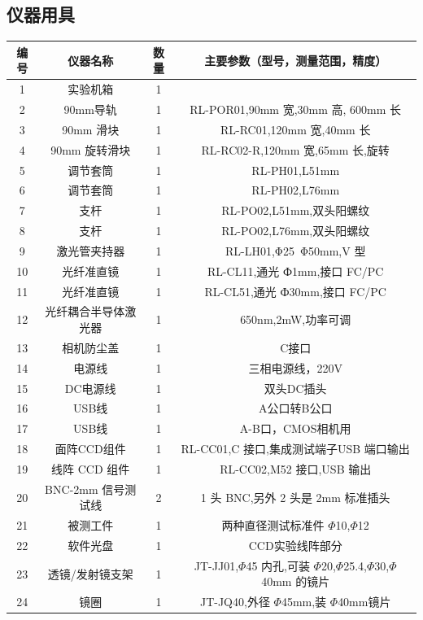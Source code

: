 \documentclass{ctexart}
\begin{document}
\subsection{仪器用具}
\begin{tabular}{c|c|c|c}
	\hline
        编号 & 仪器名称 &数量& 主要参数（型号，测量范围，精度） \\
	\hline 
	1 &  实验机箱&1 &\\
        2 &  90mm导轨&1 & RL-POR01,90mm 宽,30mm 高,
600mm 长\\
        3 & 90mm 滑块 &1&RL-RC01,120mm 宽,40mm 长\\
        4 & 90mm 旋转滑块  &1&RL-RC02-R,120mm 宽,65mm 长,旋转\\
        5 &  调节套筒 &1&RL-PH01,L51mm\\
        6 & 调节套筒 &1&RL-PH02,L76mm\\
        7 &  支杆 &1&RL-PO02,L51mm,双头阳螺纹\\
        8 &  支杆 &1&RL-PO02,L76mm,双头阳螺纹\\
        9&  激光管夹持器 &1&RL-LH01,Φ25~Φ50mm,V 型\\
        10 &  光纤准直镜 &1&RL-CL11,通光 Ф1mm,接口 FC/PC\\
        11 &  光纤准直镜 &1&RL-CL51,通光 Ф30mm,接口 FC/PC\\
        12&  光纤耦合半导体激光器 &1&650nm,2mW,功率可调\\
        13&  相机防尘盖 &1&C接口\\
        14 &  电源线 &1&三相电源线，220V\\
        15&  DC电源线 &1&双头DC插头\\
        16&  USB线 &1&A公口转B公口\\
        17&  USB线 &1&A-B口，CMOS相机用\\
        18 &  面阵CCD组件 &1&RL-CC01,C 接口,集成测试端子USB 端口输出\\
        19 &  线阵 CCD 组件 &1&RL-CC02,M52 接口,USB 输出\\
        20 &  BNC-2mm 信号测试线 &2&1 头 BNC,另外 2 头是 2mm 标准插头\\
        21 &  被测工件 &1&两种直径测试标准件 $\Phi$10,$\Phi$12\\
        22 &  软件光盘 &1&CCD实验线阵部分\\
        23&  透镜/发射镜支架 &1&JT-JJ01,$\Phi$45 内孔,可装 $\Phi$20,$\Phi$25.4,$\Phi$30,$\Phi$40mm 的镜片\\
        24 &  镜圈 &1&JT-JQ40,外径 $\Phi$45mm,装 $\Phi$40mm镜片\\

\end{tabular}
\end{document}
